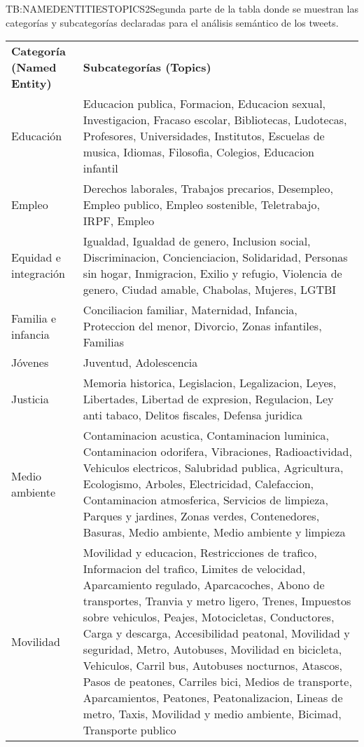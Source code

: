 \begin{table}[Relación de categorías y subcategorías para análisis semántico (II)]{TB:NAMEDENTITIESTOPICS2}{Segunda parte de la tabla donde se muestran las categorías y subcategorías declaradas para el análisis semántico de los tweets.}
	
	\begin{tabular}{|p{4.5cm}|p{12cm}|}
		\hline
		\textbf{Categoría (Named Entity)} & \textbf{Subcategorías (Topics)} \\
		Educación &  Educacion publica, Formacion, Educacion sexual, Investigacion, Fracaso escolar, Bibliotecas, Ludotecas, Profesores, Universidades, Institutos, Escuelas de musica, Idiomas, Filosofia, Colegios, Educacion infantil \\
		Empleo &  Derechos laborales, Trabajos precarios, Desempleo, Empleo publico, Empleo sostenible, Teletrabajo, IRPF, Empleo \\
		Equidad e integración &  Igualdad, Igualdad de genero, Inclusion social, Discriminacion, Concienciacion, Solidaridad, Personas sin hogar, Inmigracion, Exilio y refugio, Violencia de genero, Ciudad amable, Chabolas, Mujeres, LGTBI \\
		Familia e infancia &  Conciliacion familiar, Maternidad, Infancia, Proteccion del menor, Divorcio, Zonas infantiles, Familias \\
		Jóvenes &  Juventud, Adolescencia \\
		Justicia &  Memoria historica, Legislacion, Legalizacion, Leyes, Libertades, Libertad de expresion, Regulacion, Ley anti tabaco, Delitos fiscales, Defensa juridica \\
		Medio ambiente &  Contaminacion acustica, Contaminacion luminica, Contaminacion odorifera, Vibraciones, Radioactividad, Vehiculos electricos, Salubridad publica, Agricultura, Ecologismo, Arboles, Electricidad, Calefaccion, Contaminacion atmosferica, Servicios de limpieza, Parques y jardines, Zonas verdes, Contenedores, Basuras, Medio ambiente, Medio ambiente y limpieza \\
		Movilidad &  Movilidad y educacion, Restricciones de trafico, Informacion del trafico, Limites de velocidad, Aparcamiento regulado, Aparcacoches, Abono de transportes, Tranvia y metro ligero, Trenes, Impuestos sobre vehiculos, Peajes, Motocicletas, Conductores, Carga y descarga, Accesibilidad peatonal, Movilidad y seguridad, Metro, Autobuses, Movilidad en bicicleta, Vehiculos, Carril bus, Autobuses nocturnos, Atascos, Pasos de peatones, Carriles bici, Medios de transporte, Aparcamientos, Peatones, Peatonalizacion, Lineas de metro, Taxis, Movilidad y medio ambiente, Bicimad, Transporte publico \\
		\hline \hline
		\hline
	\end{tabular}
\end{table}


